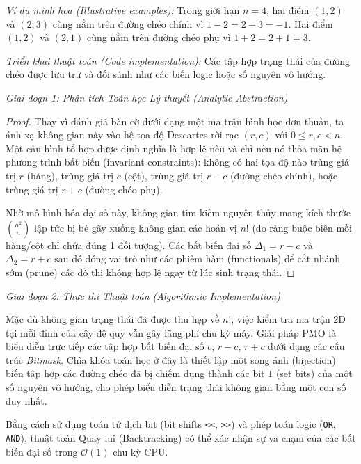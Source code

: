 \documentclass{article}
\begin{document}
\emph{Ví dụ minh họa (Illustrative examples):}
Trong giới hạn $n = 4$, hai điểm $(1, 2)$ và $(2, 3)$ cùng nằm trên đường chéo chính vì $1 - 2 = 2 - 3 = -1$. Hai điểm $(1, 2)$ và $(2, 1)$ cùng nằm trên đường chéo phụ vì $1 + 2 = 2 + 1 = 3$.

\emph{Triển khai thuật toán (Code implementation):}
Các tập hợp trạng thái của đường chéo được lưu trữ và đối sánh như các biến logic hoặc số nguyên vô hướng.

\vspace{0.5em}\noindent\emph{Giai đoạn 1: Phân tích Toán học Lý thuyết (Analytic Abstraction)}

\begin{proof}
Thay vì đánh giá bàn cờ dưới dạng một ma trận hình học đơn thuần, ta ánh xạ không gian này vào hệ tọa độ Descartes rời rạc $(r, c)$ với $0 \le r, c < n$. Một cấu hình tổ hợp được định nghĩa là hợp lệ nếu và chỉ nếu nó thỏa mãn hệ phương trình bất biến (invariant constraints): không có hai tọa độ nào trùng giá trị $r$ (hàng), trùng giá trị $c$ (cột), trùng giá trị $r-c$ (đường chéo chính), hoặc trùng giá trị $r+c$ (đường chéo phụ). 

Nhờ mô hình hóa đại số này, không gian tìm kiếm nguyên thủy mang kích thước $\binom{n^2}{n}$ lập tức bị bẻ gãy xuống không gian các hoán vị $n!$ (do ràng buộc biên mỗi hàng/cột chỉ chứa đúng 1 đối tượng). Các bất biến đại số $\Delta_1 = r-c$ và $\Delta_2 = r+c$ sau đó đóng vai trò như các phiếm hàm (functionals) để cắt nhánh sớm (prune) các đồ thị không hợp lệ ngay từ lúc sinh trạng thái.
\end{proof}

\vspace{0.5em}\noindent\emph{Giai đoạn 2: Thực thi Thuật toán (Algorithmic Implementation)}

Mặc dù không gian trạng thái đã được thu hẹp về $n!$, việc kiểm tra ma trận 2D tại mỗi đỉnh của cây đệ quy vẫn gây lãng phí chu kỳ máy. Giải pháp PMO là biểu diễn trực tiếp các tập hợp bất biến đại số $c$, $r-c$, $r+c$ dưới dạng các cấu trúc \textit{Bitmask}. Chìa khóa toán học ở đây là thiết lập một song ánh (bijection) biến tập hợp các đường chéo đã bị chiếm dụng thành các bit $1$ (set bits) của một số nguyên vô hướng, cho phép biểu diễn trạng thái không gian bằng một con số duy nhất. 

Bằng cách sử dụng toán tử dịch bit (bit shifts \texttt{<<}, \texttt{>>}) và phép toán logic (\texttt{OR}, \texttt{AND}), thuật toán Quay lui (Backtracking) có thể xác nhận sự va chạm của các bất biến đại số trong $\mathcal{O}(1)$ chu kỳ CPU.
\end{document}
